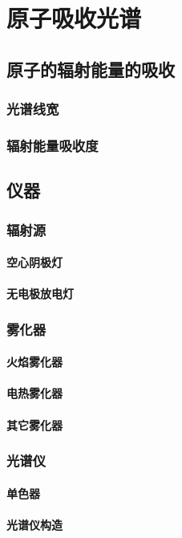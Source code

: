 \chapter{原子吸收光谱}
\section{原子的辐射能量的吸收}
\subsection{光谱线宽}
\subsection{辐射能量吸收度}
\section{仪器}
\subsection{辐射源}
\subsubsection{空心阴极灯}
\subsubsection{无电极放电灯}
\subsection{雾化器}
\subsubsection{火焰雾化器}
\subsubsection{电热雾化器}
\subsubsection{其它雾化器}
\subsection{光谱仪}
\subsubsection{单色器}
\subsubsection{光谱仪构造}
